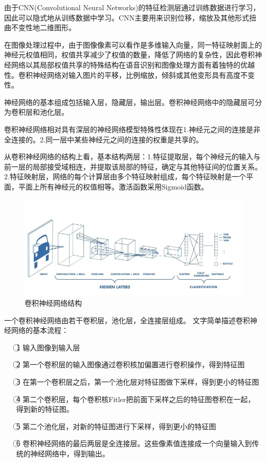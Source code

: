 \documentclass[openbib]{article}
\begin{document}
由于CNN(Convolutional Neural Networks)的特征检测层通过训练数据进行学习，因此可以隐式地从训练数据中学习。CNN主要用来识别位移，缩放及其他形式扭曲不变性地二维图形。

在图像处理过程中，由于图像像素可以看作是多维输入向量，同一特征映射面上的神经元权值相同，权值共享减少了权值的数量，降低了网络的复杂性，因此卷积神经网络以其局部权值共享的特殊结构在语音识别和图像处理方面有着独特的优越性。卷积神经网络对输入图片的平移，比例缩放，倾斜或其他变形具有高度不变性。

神经网络的基本组成包括输入层，隐藏层，输出层。卷积神经网络中的隐藏层可分为卷积层和池化层。

卷积神经网络相对具有深层的神经网络模型特殊性体现在1.神经元之间的连接是非全连接的。2.同一层中某些神经元之间的连接的权重是共享的。

从卷积神经网络的结构上看，基本结构两层：1.特征提取层，每个神经元的输入与前一层的局部接受域相连，并提取该局部的特征，确定与其他特征间的位置关系。2.特征映射层，网络的每个计算层由多个特征映射组成，每个特征映射是一个平面，平面上所有神经元的权值相等。激活函数采用Sigmoid函数。

	\begin{figure}[htbp]
	\centering
	\includegraphics[scale=0.38]{卷积神经网络结构.jpg}
	\caption{卷积神经网络结构}
	\end{figure}

一个卷积神经网络由若干卷积层，池化层，全连接层组成。
文字简单描述卷积神经网络的基本流程：
\begin{itemize}
\item[\textcircled{1}] 输入图像到输入层
\item[\textcircled{2}] 第一个卷积层的输入图像通过卷积核加偏置进行卷积操作，得到特征图
\item[\textcircled{3}] 在第一个卷积层之后，第一个池化层对特征图做下采样，得到更小的特征图
\item[\textcircled{4}] 第二个卷积层，每个卷积核Fitler把前面下采样之后的特征图卷积在一起，得到新的特征图。
\item[\textcircled{5}] 第二个池化层，对新的特征图进行下采样，得到更小的特征图
\item[\textcircled{6}] 卷积神经网络的最后两层是全连接层。这些像素值连接成一个向量输入到传统的神经网络中，得到输出。
\end{itemize}
\end{document}
